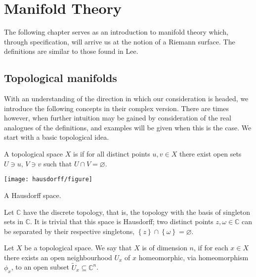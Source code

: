 \chapter{Manifold Theory}\label{ch:manifold-theory}
\begin{chout}
	The following chapter serves as an introduction to manifold theory which,
	through specification, will arrive us at the notion of a Riemann surface.
	The definitions are similar to those found in Lee\sidenotemark.
\end{chout}

\section{Topological manifolds}
With an understanding of the direction in which our consideration is headed, we
introduce the following concepts in their complex version. There are times
however, when further intuition may be gained by consideration of the real
analogues of the definitions, and examples will be given when this is the case.
We start with a basic topological idea.

\begin{definition}[Hausdorff]
	A topological space $ X $ is  if for all distinct points $
		u,v \in X $ there exist open sets $ U \ni u $, $ V \ni v $ such that $ U \cap V
		= \varnothing $.
\end{definition}

\begin{marginfigure}
	\centering
	\texttt{[image: hausdorff/figure]}
	\caption{A Hausdorff space.}
\end{marginfigure}

\begin{example}\label{ex:complex-plane-discrete}
	Let $ \mathbb{C} $ have the discrete topology, that is, the topology with the
	basis of singleton sets in $ \mathbb{C} $. It is trivial that this space is
	Hausdorff; two distinct points $ z, \omega \in \mathbb{C} $ can be separated by
	their respective singletons, $ \left\{ z \right\} \cap \left\{ \omega \right\}
		= \varnothing $.
\end{example}

\begin{definition}
	Let $ X $ be a topological space. We say that $ X $ is  of dimension $ n $, if for each $ x \in X $ there exists an open
	neighbourhood $ U_x $ of $ x $ homeomorphic, via homeomorphism $ \phi_x $, to an
	open subset $ \tilde{U}_{x}\subseteq \mathbb{C}^{n} $.
\end{definition}

